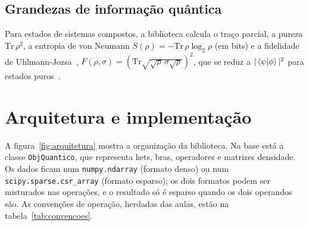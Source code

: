 \documentclass[11pt,a4paper]{article}
\newcommand{\codigo}[1]{\texttt{#1}}
\begin{document}
\subsection{Grandezas de informação quântica}

Para estados de sistemas compostos, a biblioteca calcula o traço parcial, a pureza
$\mathrm{Tr}\,\rho^2$, a entropia de von Neumann $S(\rho) = -\mathrm{Tr}\,\rho\log_2\rho$
(em bits) e a fidelidade de Uhlmann-Jozsa~\cite{uhlmann1976,jozsa1994},
$F(\rho,\sigma) = \left(\mathrm{Tr}\sqrt{\sqrt{\rho}\,\sigma\sqrt{\rho}}\right)^2$, que se
reduz a $|\braket{\psi|\phi}|^2$ para estados puros~\cite{nielsen2010}.

\section{Arquitetura e implementação}\label{sec:arquitetura}

A figura~\ref{fig:arquitetura} mostra a organização da biblioteca. Na base está a classe
\codigo{ObjQuantico}, que representa kets, bras, operadores e matrizes densidade. Os dados
ficam num \codigo{numpy.ndarray} (formato denso) ou num \codigo{scipy.sparse.csr\_array}
(formato esparso); os dois formatos podem ser misturados nas operações, e o resultado só
é esparso quando os dois operandos são. As convenções de operação, herdadas das aulas,
estão na tabela~\ref{tab:convencoes}.
\end{document}
